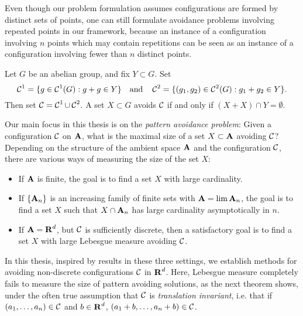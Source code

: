 
Even though our problem formulation assumes configurations are formed by distinct sets of points, one can still formulate avoidance problems involving repeated points in our framework, because an instance of a configuration involving $n$ points which may contain repetitions can be seen as an instance of a configuration involving fewer than $n$ distinct points.

\begin{example}
	Let $G$ be an abelian group, and fix $Y \subset G$. Set
	\[ \operatorname{\mathcal{C}}^1 = \{ g \in \operatorname{\mathcal{C}}^1(G): g + g \in Y \} \quad \text{and} \quad \operatorname{\mathcal{C}}^2 = \{ (g_1,g_2) \in \operatorname{\mathcal{C}}^2(G): g_1 + g_2 \in Y \}. \]
	Then set $\operatorname{\mathcal{C}} = \operatorname{\mathcal{C}}^1 \cup \operatorname{\mathcal{C}}^2$. A set $X \subset G$ avoids $\operatorname{\mathcal{C}}$ if and only if $(X + X) \cap Y = \emptyset$.
\end{example}

Our main focus in this thesis is on the {\it pattern avoidance problem}: Given a configuration $\operatorname{\mathcal{C}}$ on $\operatorname{\mathbf{A}}$, what is the maximal size of a set $X \subset \operatorname{\mathbf{A}}$ avoiding $\operatorname{\mathcal{C}}$? Depending on the structure of the ambient space $\operatorname{\mathbf{A}}$ and the configuration $\operatorname{\mathcal{C}}$, there are various ways of measuring the size of the set $X$:
%
\begin{itemize}
	\item If $\operatorname{\mathbf{A}}$ is finite, the goal is to find a set $X$ with large cardinality.
	\item If $\{ \operatorname{\mathbf{A}}_n \}$ is an increasing family of finite sets with $\operatorname{\mathbf{A}} = \lim \operatorname{\mathbf{A}}_n$, the goal is to find a set $X$ such that $X \cap \operatorname{\mathbf{A}}_n$ has large cardinality asymptotically in $n$.
	\item If $\operatorname{\mathbf{A}} = \operatorname{\mathbf{R}}^d$, but $\operatorname{\mathcal{C}}$ is sufficiently discrete, then a satisfactory goal is to find a set $X$ with large Lebesgue measure avoiding $\operatorname{\mathcal{C}}$.
\end{itemize}
%
In this thesis, inspired by results in these three settings, we establish methods for avoiding non-discrete configurations $\operatorname{\mathcal{C}}$ in $\operatorname{\mathbf{R}}^d$. Here, Lebesgue measure completely fails to measure the size of pattern avoiding solutions, as the next theorem shows, under the often true assumption that $\operatorname{\mathcal{C}}$ is \emph{translation invariant}, i.e. that if $(a_1, \dots, a_n) \in \operatorname{\mathcal{C}}$ and $b \in \operatorname{\mathbf{R}}^d$, $(a_1 + b, \dots, a_n + b) \in \operatorname{\mathcal{C}}$.


